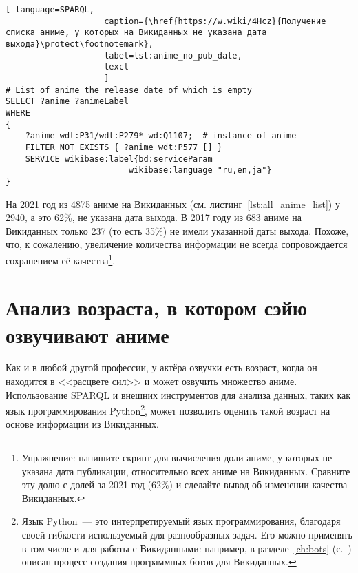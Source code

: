 \lstset{numbers=left, firstnumber=1, frame=single}
\begin{lstlisting}[ language=SPARQL, 
                    caption={\href{https://w.wiki/4Hcz}{Получение списка аниме, у которых на Викиданных не указана дата выхода}\protect\footnotemark},
                    label=lst:anime_no_pub_date,
                    texcl 
                    ]
# List of anime the release date of which is empty
SELECT ?anime ?animeLabel
WHERE
{
    ?anime wdt:P31/wdt:P279* wd:Q1107;  # instance of anime
    FILTER NOT EXISTS { ?anime wdt:P577 [] }
    SERVICE wikibase:label{bd:serviceParam
					     wikibase:language "ru,en,ja"}
}
\end{lstlisting}%
\lstset{numbers=none}

На 2021 год из \num{4875} аниме на Викиданных (см. листинг~\ref{lst:all_anime_list}) у \num{2940}, а это \num{62}\%, не указана дата выхода. В 2017 году из \num{683} аниме на Викиданных только \num{237} (то есть \num{35}\%) не имели указанной даты выхода. Похоже, что, к сожалению, увеличение количества информации не всегда сопровождается сохранением её качества\footnote{Упражнение: напишите скрипт для вычисления доли аниме, у которых не указана дата публикации, относительно всех аниме на Викиданных. Сравните эту долю с долей за 2021 год (\num{62}\%) и сделайте вывод об изменении качества Викиданных.}.

\section{Анализ возраста, в котором сэйю озвучивают аниме}

Как и в любой другой профессии, у актёра озвучки есть возраст, когда он находится в <<расцвете сил>> и может озвучить множество аниме. Использование SPARQL и внешних инструментов для анализа данных, таких как язык программирования Python\footnote[][-1cm]{Язык Python~--- это интерпретируемый язык программирования, благодаря своей гибкости используемый для разнообразных задач. Его можно применять в том числе и для работы с Викиданными: например, в разделе~\ref{ch:bots} (с.~\pageref{ch:bots}) описан процесс создания программных ботов для Викиданных.}, может позволить оценить такой возраст на основе информации из Викиданных.


